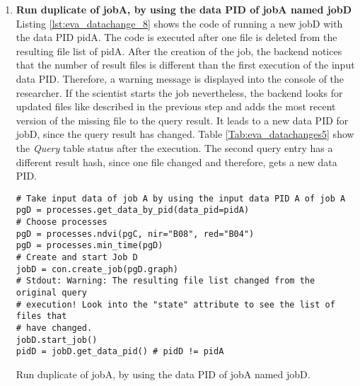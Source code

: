 \documentclass[draft,final]{vutinfth} %
\newenvironment{code}{\captionsetup{type=listing}}{}
\begin{document}
\begin{enumerate}
	\begin{code}
		\begin{verbatim} 
[{'timestamp': '2019-03-31 17:44:43', 
'path': '/eodc/products/copernicus.eu/s2a_prd_msil1c/2017/05/24/
S2A_MSIL1C_20170524T101031_N0205_R022_T32TQR_20170524T101353_new.zip'}]
		\end{verbatim}
		\caption{List of files that replaced original files of the query result.}
		\label{lst:eva_datachange_state}
	\end{code}
	
	\item \textbf{Run duplicate of jobA, by using the data PID of jobA named jobD}\\
	Listing \ref{lst:eva_datachange_8} shows the code of running a new jobD with the data PID pidA. The code is executed after one file is deleted from the resulting file list of pidA. After the creation of the job, the backend notices that the number of result files is different than the first execution of the input data PID. Therefore, a warning message is displayed into the console of the researcher. If the scientist starts the job nevertheless, the backend looks for updated files like described in the previous step and adds the most recent version of the missing file to the query result. It leads to a new data PID for jobD, since the query result has changed. Table \ref{Tab:eva_datachanges5} show the \textit{Query} table status after the execution. The second query entry has a different result hash, since one file changed and therefore, gets a new data PID. 
	\begin{code}
		\begin{verbatim}
# Take input data of job A by using the input data PID A of job A
pgD = processes.get_data_by_pid(data_pid=pidA)
# Choose processes
pgD = processes.ndvi(pgC, nir="B08", red="B04")
pgD = processes.min_time(pgD)
# Create and start Job D
jobD = con.create_job(pgD.graph)
# Stdout: Warning: The resulting file list changed from the original query
# execution! Look into the "state" attribute to see the list of files that
# have changed. 
jobD.start_job()
pidD = jobD.get_data_pid() # pidD != pidA
		\end{verbatim}
		\caption{Run duplicate of jobA, by using the data PID of jobA named jobD.}
		\label{lst:eva_datachange_8}
	\end{code}
	

\end{enumerate}
\end{document}
